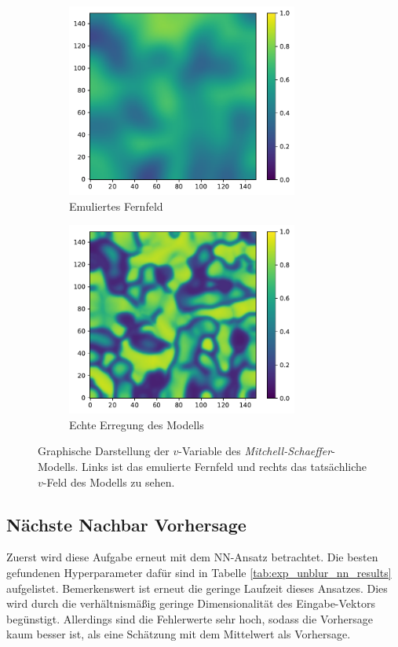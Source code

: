 \begin{figure}[h]
	\centering
	\begin{subfigure}{.5\textwidth}
		\centering
		\includegraphics[height=2.5in]{figures/results/unblur/mitchell_v_blur_blured.pdf}
		\setcapmargin[1cm]{1cm}
		\caption{Emuliertes Fernfeld}
		\label{fig:exp_unblur_mitchell_schaeffer_blurred}
	\end{subfigure}%
	\begin{subfigure}{.5\textwidth}
		\centering
		\includegraphics[height=2.5in]{figures/results/unblur/mitchell_v_blur_orig.pdf}
		\setcapmargin[1cm]{1cm}
  		\caption{Echte Erregung des Modells}
  		\label{fig:exp_unblur_mitchell_schaeffer_orig}
	\end{subfigure}
	\caption{Graphische Darstellung der $v$-Variable des \textit{Mitchell-Schaeffer}-Modells. Links ist das emulierte Fernfeld und rechts das tatsächliche $v$-Feld des Modells zu sehen.}
	\label{fig:exp_unblur_mitchell_schaeffer}
\end{figure} 

\subsection{Nächste Nachbar Vorhersage}
Zuerst wird diese Aufgabe erneut mit dem \textsc{NN}-Ansatz betrachtet. Die besten gefundenen Hyperparameter dafür sind in Tabelle \ref{tab:exp_unblur_nn_results} aufgelistet. Bemerkenswert ist erneut die geringe Laufzeit dieses Ansatzes. Dies wird durch die verhältnismäßig geringe Dimensionalität des Eingabe-Vektors begünstigt. Allerdings sind die Fehlerwerte sehr hoch, sodass die Vorhersage kaum besser ist, als eine Schätzung mit dem Mittelwert als Vorhersage.

